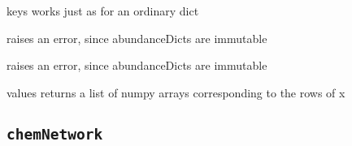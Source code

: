 \documentclass[letterpaper,10pt,english]{sphinxmanual}
\begin{document}
\begin{fulllineitems}
\begin{fulllineitems}
\end{fulllineitems}


\begin{fulllineitems}
\label{fulldoc:despotic.chemistry.abundanceDict.keys}
keys works just as for an ordinary dict

\end{fulllineitems}


\begin{fulllineitems}
\label{fulldoc:despotic.chemistry.abundanceDict.pop}
raises an error, since abundanceDicts are
immutable

\end{fulllineitems}


\begin{fulllineitems}
\label{fulldoc:despotic.chemistry.abundanceDict.popitem}
raises an error, since abundanceDicts are
immutable

\end{fulllineitems}


\begin{fulllineitems}
\label{fulldoc:despotic.chemistry.abundanceDict.values}
values returns a list of numpy arrays corresponding to the
rows of x

\end{fulllineitems}


\end{fulllineitems}



\subsection{\texttt{chemNetwork}}
\label{fulldoc:chemnetwork}
\end{document}
